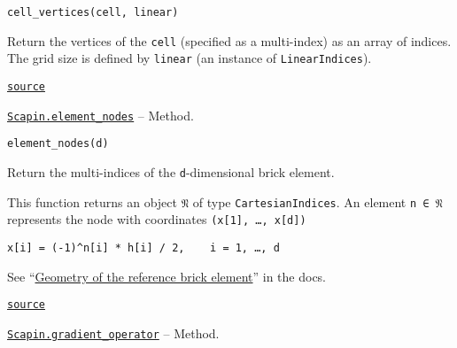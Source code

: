 \documentclass[oneside]{memoir}
\begin{document}
\begin{adjustwidth}{2em}{0pt}


\begin{verbatim}
cell_vertices(cell, linear)
\end{verbatim}

Return the vertices of the \texttt{cell} (specified as a multi-index) as an array of indices. The grid size is defined by \texttt{linear} (an instance of \texttt{LinearIndices}).



\href{https://github.com/sbrisard/Scapin.jl/blob/ea3f90c60e90cdf214e41b1314a8ee608e0b8d10/src/bri17.jl#L282-L288}{\texttt{source}}


\end{adjustwidth}
\hypertarget{6536319419682078378}{} 
\hyperlink{6536319419682078378}{\texttt{Scapin.element\_nodes}}  -- {Method.}

\begin{adjustwidth}{2em}{0pt}


\begin{verbatim}
element_nodes(d)
\end{verbatim}

Return the multi-indices of the \texttt{d}-dimensional brick element.

This function returns an object \texttt{𝔑} of type \texttt{CartesianIndices}. An element \texttt{n ∈ 𝔑} represents the node with coordinates \texttt{(x[1], …, x[d])}


\begin{lstlisting}
x[i] = (-1)^n[i] * h[i] / 2,    i = 1, …, d
\end{lstlisting}

See “\hyperlink{15016019730971184536}{Geometry of the reference brick element}” in the docs.



\href{https://github.com/sbrisard/Scapin.jl/blob/ea3f90c60e90cdf214e41b1314a8ee608e0b8d10/src/bri17.jl#L111-L124}{\texttt{source}}


\end{adjustwidth}
\hypertarget{11073413609374358964}{} 
\hyperlink{11073413609374358964}{\texttt{Scapin.gradient\_operator}}  -- {Method.}
\end{document}
